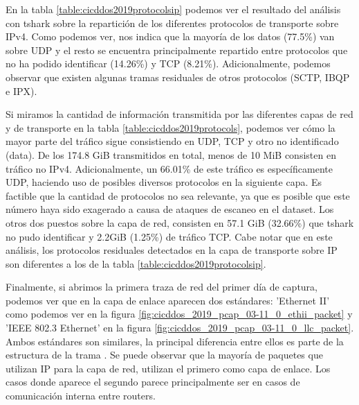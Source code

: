 En la tabla \ref{table:cicddos2019protocolsip} podemos ver el resultado del análisis con tshark sobre la repartición de los diferentes protocolos de transporte sobre IPv4. Como podemos ver, nos indica que la mayoría de los datos (77.5\%) van sobre UDP y el resto se encuentra principalmente repartido entre protocolos que no ha podido identificar (14.26\%) y TCP (8.21\%). Adicionalmente, podemos observar que existen algunas tramas residuales de otros protocolos (SCTP, IBQP e IPX).



Si miramos la cantidad de información transmitida por las diferentes capas de red y de transporte en la tabla \ref{table:cicddos2019protocols}, podemos ver cómo la mayor parte del tráfico sigue consistiendo en UDP, TCP y otro no identificado (data). De los 174.8 GiB transmitidos en total, menos de 10 MiB consisten en tráfico no IPv4. Adicionalmente, un 66.01\% de este tráfico es específicamente UDP, haciendo uso de posibles diversos protocolos en la siguiente capa. Es factible que la cantidad de protocolos no sea relevante, ya que es posible que este número haya sido exagerado a causa de ataques de escaneo en el dataset. Los otros dos puestos sobre la capa de red, consisten en 57.1 GiB (32.66\%) que tshark no pudo identificar y 2.2GiB (1.25\%) de tráfico TCP. Cabe notar que en este análisis, los protocolos residuales detectados en la capa de transporte sobre IP son diferentes a los de la tabla \ref{table:cicddos2019protocolsip}.



Finalmente, si abrimos la primera traza de red del primer día de captura, podemos ver que en la capa de enlace aparecen dos estándares: 'Ethernet II' como podemos ver en la figura \ref{fig:cicddos_2019_pcap_03-11_0_ethii_packet} y 'IEEE 802.3 Ethernet' en la figura \ref{fig:cicddos_2019_pcap_03-11_0_llc_packet}. Ambos estándares son similares, la principal diferencia entre ellos es parte de la estructura de la trama \cite{IBMeth2vsllc}. Se puede observar que la mayoría de paquetes que utilizan IP para la capa de red, utilizan el primero como capa de enlace. Los casos donde aparece el segundo parece principalmente ser en casos de comunicación interna entre routers.

